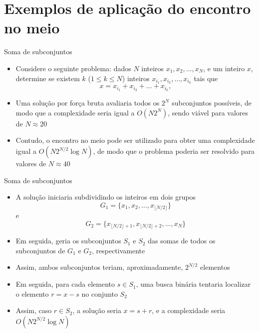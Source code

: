 \section{Exemplos de aplicação do encontro no meio}

\begin{frame}[fragile]{Soma de subconjuntos}

    \begin{itemize}
        \item Considere o seguinte problema: dados $N$ inteiros $x_1, x_2, \ldots, x_N$, e um
            inteiro $x$, determine se existem $k$ ($1\leq k\leq N$) inteiros 
            $x_{i_1}, x_{i_2}, \ldots, x_{i_k}$ tais que
            \[
                x = x_{i_1} + x_{i_2} + \ldots + x_{i_k},
            \] 

        \item Uma solução por força bruta avaliaria todos os $2^N$ subconjuntos possíveis, de modo
            que a complexidade seria igual a $O(N2^N)$, sendo viável para valores de $N \approx 20$

        \item Contudo, o encontro no meio pode ser utilizado para obter uma complexidade
            igual a $O(N2^{N/2}\log N)$, de modo que o problema poderia ser resolvido para valores de
            $N\approx 40$
       
    \end{itemize}

\end{frame}

\begin{frame}[fragile]{Soma de subconjuntos}

    \begin{itemize}
        \item A solução iniciaria subdividindo os inteiros em dois grupos
        \[
            G_1 = \lbrace x_1, x_2, \ldots, x_{\lfloor N/2\rfloor}\rbrace
        \]
        e
        \[
            G_2 = \lbrace x_{\lfloor N/2\rfloor + 1}, x_{\lfloor N/2\rfloor + 2}, \ldots, x_{N}\rbrace
        \]

        \item Em seguida, geria os subconjuntos $S_1$ e $S_2$ das somas de todos os subconjuntos de
            $G_1$ e $G_2$, respectivamente

        \item Assim, ambos subconjuntos teriam, aproximadamente, $2^{N/2}$ elementos

        \item Em seguida, para cada elemento $s\in S_1$, uma busca binária tentaria localizar o
            elemento $r = x - s$ no conjunto $S_2$

        \item Assim, caso $r\in S_2$, a solução seria $x = s + r$, e a complexidade seria
            $O(N2^{N/2}\log N)$
    \end{itemize}

\end{frame}

